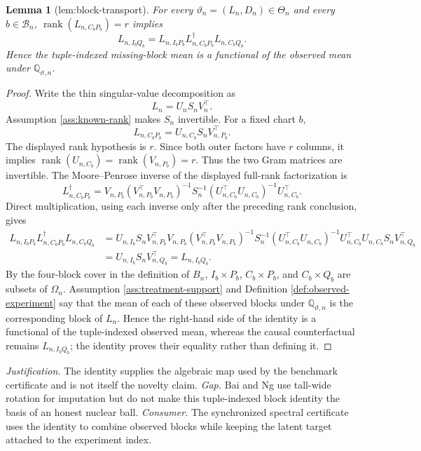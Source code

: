 \documentclass{article}
\newtheorem{lemma}{Lemma}
\begin{document}
\begin{lemma}[lem:block-transport]\label{lem:block-transport}
For every \(\vartheta_n=(L_n,D_n)\in\Theta_n\) and every \(b\in\mathcal B_n\), \(\operatorname{rank}(L_{n,C_bP_b})=r\) implies \[L_{n,I_bQ_b}=L_{n,I_bP_b}L_{n,C_bP_b}^{\dagger}L_{n,C_bQ_b}.\] Hence the tuple-indexed missing-block mean is a functional of the observed mean under \(\mathbb Q_{\vartheta,n}\).
\end{lemma}
\begin{proof}
Write the thin singular-value decomposition as
\[
L_n=U_nS_nV_n^{\top}.
\]
Assumption \ref{ass:known-rank} makes \(S_n\) invertible.  For a fixed chart \(b\),
\[
L_{n,C_bP_b}=U_{n,C_b}S_nV_{n,P_b}^{\top}.
\]
The displayed rank hypothesis is \(r\).  Since both outer factors have \(r\) columns, it implies
\(\operatorname{rank}(U_{n,C_b})=\operatorname{rank}(V_{n,P_b})=r\).  Thus the two Gram matrices are invertible.  The Moore--Penrose inverse of the displayed full-rank factorization is
\[
L_{n,C_bP_b}^{\dagger}
=V_{n,P_b}(V_{n,P_b}^{\top}V_{n,P_b})^{-1}
S_n^{-1}(U_{n,C_b}^{\top}U_{n,C_b})^{-1}U_{n,C_b}^{\top}.
\]
Direct multiplication, using each inverse only after the preceding rank conclusion, gives
\[
\begin{aligned}
L_{n,I_bP_b}L_{n,C_bP_b}^{\dagger}L_{n,C_bQ_b}
&=U_{n,I_b}S_nV_{n,P_b}^{\top}
V_{n,P_b}(V_{n,P_b}^{\top}V_{n,P_b})^{-1}
S_n^{-1}(U_{n,C_b}^{\top}U_{n,C_b})^{-1}U_{n,C_b}^{\top}
U_{n,C_b}S_nV_{n,Q_b}^{\top}\\
&=U_{n,I_b}S_nV_{n,Q_b}^{\top}
=L_{n,I_bQ_b}.
\end{aligned}
\]
By the four-block cover in the definition of \(B_n\), \(I_b\times P_b\), \(C_b\times P_b\), and \(C_b\times Q_b\) are subsets of \(\Omega_n\).  Assumption \ref{ass:treatment-support} and Definition \ref{def:observed-experiment} say that the mean of each of these observed blocks under \(\mathbb Q_{\vartheta,n}\) is the corresponding block of \(L_n\).  Hence the right-hand side of the identity is a functional of the tuple-indexed observed mean, whereas the causal counterfactual remains \(L_{n,I_bQ_b}\); the identity proves their equality rather than defining it.
\end{proof}
\par\smallskip\noindent \textit{Justification.} The identity supplies the algebraic map used by the benchmark certificate and is not itself the novelty claim. \textit{Gap.} Bai and Ng use tall-wide rotation for imputation but do not make this tuple-indexed block identity the basis of an honest nuclear ball. \textit{Consumer.} The synchronized spectral certificate uses the identity to combine observed blocks while keeping the latent target attached to the experiment index.
\end{document}
